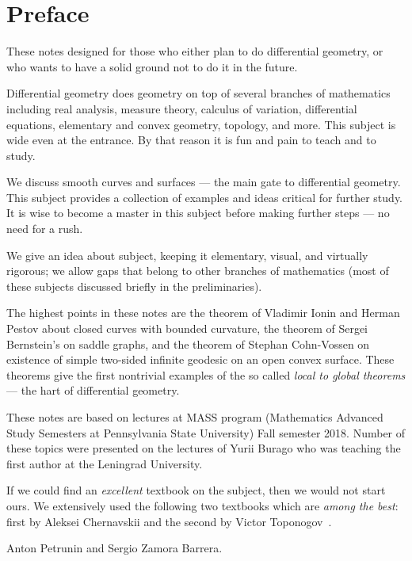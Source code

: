 
\chapter*{Preface}

These notes designed for those who either plan to do differential geometry,
or who wants to have a solid ground not to do it in the future.

Differential geometry does geometry on top of several branches of mathematics including 
real analysis, 
measure theory,
calculus of variation,
differential equations,
elementary and convex geometry,
topology, and more.
This subject is wide even at the entrance. 
By that reason it is fun and pain to teach and to study.

We discuss smooth curves and surfaces --- the main gate to differential geometry.
This subject provides a collection of examples and ideas critical for further study.
It is wise to become a master in this subject before making further steps --- no need for a rush.

We give an idea about subject, keeping it elementary, visual, and virtually rigorous; we allow gaps that belong to other branches of mathematics (most of these subjects discussed briefly in the preliminaries).

The highest points in these notes are
the theorem of Vladimir Ionin and Herman Pestov about closed curves with bounded curvature,
the theorem of Sergei Bernstein's on saddle graphs,
and the theorem of Stephan Cohn-Vossen on existence of simple two-sided infinite geodesic on an open convex surface.
These theorems give the first nontrivial examples of the so called {}\emph{local to global theorems} --- the hart of differential geometry.

These notes are based on lectures at MASS program (Mathematics Advanced Study Semesters at Pennsylvania State University) Fall semester 2018.
Number of these topics were presented on the lectures of Yurii Burago who was teaching the first author at the Leningrad University.

If we could find an \emph{excellent} textbook on the subject, then we would not start ours.
We extensively used the following two textbooks which are \emph{among the best}: first by Aleksei Chernavskii \cite{chernavsky} and the second by Victor Toponogov~\cite{toponogov-book}.

\begin{flushright}
Anton Petrunin and
Sergio Zamora Barrera.
\end{flushright}



\newpage
\tableofcontents
